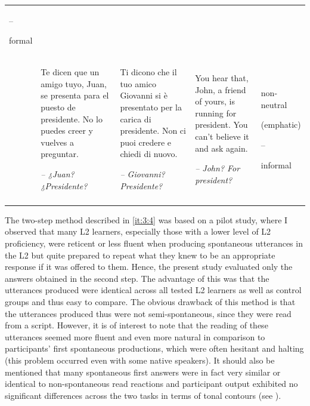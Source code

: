 \begin{table}
\begin{tabularx}{\textwidth}{lQQQ>{\raggedright\arraybackslash}p{2cm}}
--

formal\\
 & Te dicen que un amigo tuyo, Juan, se presenta para el puesto de presidente. No lo puedes creer y vuelves a preguntar.

{\itshape -- ¿Juan? ¿Presidente?} & Ti dicono che il tuo amico Giovanni si è presentato per la carica di presidente. Non ci puoi credere e chiedi di nuovo.

{\itshape -- Giovanni? Presidente?} & You hear that, John, a friend of yours, is running for president. You can’t believe it and ask again.

{\itshape -- John? For president?} & non-neutral

(emphatic)

--

informal\\
\lspbottomrule
\end{tabularx}

\end{table}



The two-step method described in \ref{it:3:4} was based on a pilot study, where I observed that many L2 learners, especially those with a lower level of L2 proficiency, were reticent or less fluent when producing spontaneous utterances in the L2 but quite prepared to repeat what they knew to be an appropriate response if it was offered to them. Hence, the present study evaluated only the answers obtained in the second step. The advantage of this was that the utterances produced were identical across all tested L2 learners as well as control groups and thus easy to compare. The obvious drawback of this method is that the utterances produced thus were not semi-spontaneous, since they were read from a script. However, it is of interest to note that the reading of these utterances seemed more fluent and even more natural in comparison to participants’ first spontaneous productions, which were often hesitant and halting (this problem occurred even with some native speakers). It should also be mentioned that many spontaneous first answers were in fact very similar or identical to non-spontaneous read reactions and participant output exhibited no significant differences across the two tasks in terms of tonal contours (see ).




